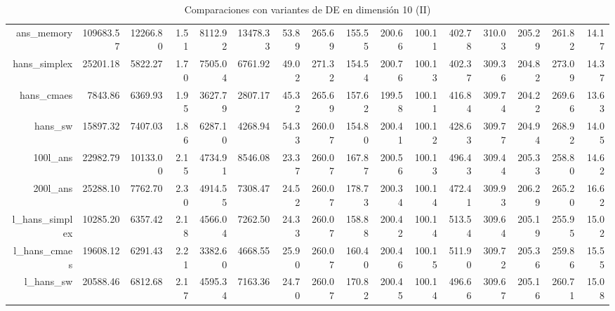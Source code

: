 \begin{table}[h!]
\begin{tabular}{rrrrrrrrrrrrrrrr}
  ans\_memory & 109683.57 & 12266.80 & 1.51 & 8112.92 & 13478.33 & 53.89 & 265.69 & 155.55 & 200.66 & 100.11 & 402.78 & 310.03 & 205.29 & 261.82 & 14.17 \\ 
  hans\_simplex & 25201.18 & 5822.27 & 1.70 & 7505.04 & 6761.92 & 49.02 & 271.32 & 154.54 & 200.76 & 100.13 & 402.37 & 309.36 & 204.82 & 273.09 & 14.37 \\ 
  hans\_cmaes & 7843.86 & 6369.93 & 1.95 & 3627.79 & 2807.17 & 45.32 & 265.69 & 157.62 & 199.58 & 100.11 & 416.84 & 309.74 & 204.22 & 269.66 & 13.63 \\ 
  hans\_sw & 15897.32 & 7407.03 & 1.86 & 6287.10 & 4268.94 & 54.33 & 260.07 & 154.80 & 200.41 & 100.12 & 428.63 & 309.77 & 204.94 & 268.92 & 14.05 \\ 
  100l\_ans & 22982.79 & 10133.00 & 2.15 & 4734.91 & 8546.08 & 23.37 & 260.07 & 167.87 & 200.56 & 100.13 & 496.43 & 309.44 & 205.33 & 258.80 & 14.62 \\ 
  200l\_ans & 25288.10 & 7762.70 & 2.30 & 4914.55 & 7308.47 & 24.52 & 260.07 & 178.73 & 200.34 & 100.14 & 472.41 & 309.93 & 206.29 & 265.20 & 16.62 \\ 
  l\_hans\_simplex & 10285.20 & 6357.42 & 2.18 & 4566.04 & 7262.50 & 24.33 & 260.07 & 158.88 & 200.42 & 100.14 & 513.54 & 309.64 & 205.19 & 255.95 & 15.02 \\ 
  l\_hans\_cmaes & 19608.12 & 6291.43 & 2.21 & 3382.60 & 4668.55 & 25.90 & 260.07 & 160.40 & 200.46 & 100.15 & 511.90 & 309.72 & 205.36 & 259.86 & 15.55 \\ 
  l\_hans\_sw & 20588.46 & 6812.68 & 2.17 & 4595.34 & 7163.36 & 24.70 & 260.07 & 170.82 & 200.45 & 100.14 & 496.66 & 309.67 & 205.16 & 260.71 & 15.08 \\ 
   \hline
\end{tabular}
\endgroup
\caption{Comparaciones con variantes de DE en dimensión 10 (II)} 
\label{complete10b}
\end{table}
